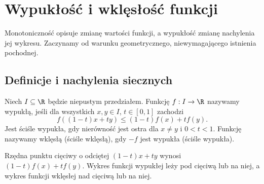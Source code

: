 \chapter{Wypukłość i wklęsłość funkcji}
\label{ma1:ch:convexity}

Monotoniczność opisuje zmianę wartości funkcji, a wypukłość zmianę nachylenia jej wykresu. Zaczynamy od warunku geometrycznego, niewymagającego istnienia pochodnej.

\section{Definicje i nachylenia siecznych}
\begin{definicja}
\label{ma1:def:convex-function}
Niech $I\subseteq\R$ będzie niepustym przedziałem. Funkcję $f:I\to\R$ nazywamy wypukłą, jeśli dla wszystkich $x,y\in I$, $t\in[0,1]$ zachodzi
\[
 f((1-t)x+ty)\le(1-t)f(x)+tf(y).
\]
Jest ściśle wypukła, gdy nierówność jest ostra dla $x\ne y$ i $0<t<1$. Funkcję nazywamy wklęsłą (ściśle wklęsłą), gdy $-f$ jest wypukła (ściśle wypukła).
\end{definicja}
Rzędna punktu cięciwy o odciętej $(1-t)x+ty$ wynosi $(1-t)f(x)+tf(y)$. Wykres funkcji wypukłej leży pod cięciwą lub na niej, a wykres funkcji wklęsłej nad cięciwą lub na niej.

